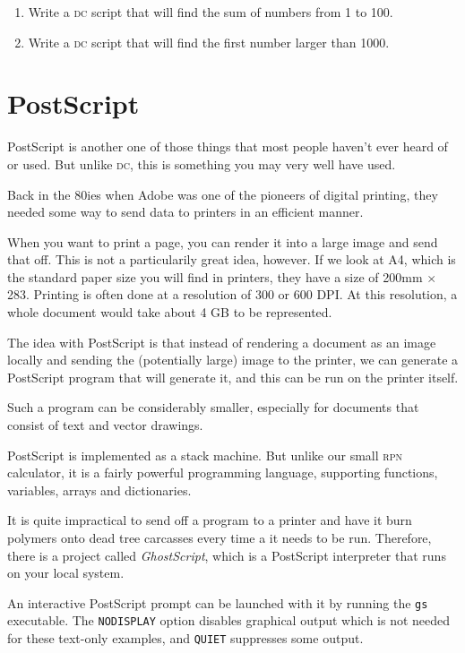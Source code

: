 \documentclass[a4paper,twocolumn]{article}
\begin{document}
\begin{enumerate}
  \item Write a \textsc{dc} script that will find the sum of numbers from 1 to 100.
  \item Write a \textsc{dc} script that will find the first number larger than 1000.
\end{enumerate}

\section{PostScript}

PostScript is another one of those things that most people haven't ever heard of or used. But unlike \textsc{dc}, this is something you may very well have used.

Back in the 80ies when Adobe was one of the pioneers of digital printing, they needed some way to send data to printers in an efficient manner.

When you want to print a page, you can render it into a large image and send that off. This is not a particularily great idea, however. If we look at A4, which is the standard paper size you will find in printers, they have a size of 200mm $\times$ 283. Printing is often done at a resolution of 300 or 600 DPI. At this resolution, a whole document would take about 4 GB to be represented.

The idea with PostScript is that instead of rendering a document as an image locally and sending the (potentially large) image to the printer, we can generate a PostScript program that will generate it, and this can be run on the printer itself.

Such a program can be considerably smaller, especially for documents that consist of text and vector drawings.

PostScript is implemented as a stack machine. But unlike our small \textsc{rpn} calculator, it is a fairly powerful programming language, supporting functions, variables, arrays and dictionaries.

It is quite impractical to send off a program to a printer and have it burn polymers onto dead tree carcasses every time a it needs to be run. Therefore, there is a project called \emph{GhostScript}, which is a PostScript interpreter that runs on your local system.

An interactive PostScript prompt can be launched with it by running the \verb|gs| executable. The \verb|NODISPLAY| option disables graphical output which is not needed for these text-only examples, and \verb|QUIET| suppresses some output.
\end{document}
